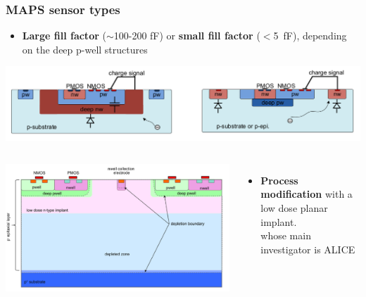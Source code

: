     
    \begin{frame}[noframenumbering]
        \frametitle{MAPS sensor types}
            \begin{itemize}
                \item \textbf{Large fill factor} ($\sim$100-200 \si{fF}) or \textbf{small fill factor} ($<$\SI{5}{fF}), depending on the deep p-well structures
            \end{itemize}
            \includegraphics[width=1.05\linewidth]{figures/Pixel_detectors/large_small_sensor_scheme.png}\\
            \begin{columns}
                    \includegraphics[width=1.1\linewidth]{figures/Pixel_detectors/ALPIDE_after_PM.png}
                    \begin{itemize}
                        \item \textbf{Process modification} with a low dose planar implant. \\
                        whose main investigator is ALICE\\
                    \end{itemize} 
            \end{columns}

            \end{frame} 


